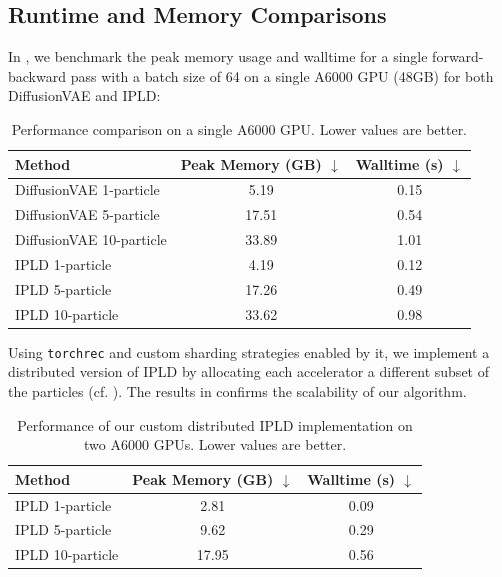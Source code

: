 \subsection{Runtime and Memory Comparisons}
\label{app:runtime-compare}
In , we benchmark the peak memory usage and walltime for a single forward-backward pass with a batch size of 64 on a single A6000 GPU (48GB) for both \gls*{DiffusionVAE} and \gls*{IPLD}:
\begin{table}[h!]
\centering
\caption{Performance comparison on a single A6000 GPU. Lower values are better.}
\label{tab:single_gpu_performance}
\begin{tabular}{
  l
  S[table-format=2.2]
  S[table-format=1.2]
}
\toprule
\textbf{Method} & {\textbf{Peak Memory (GB) $\downarrow$}} & {\textbf{Walltime (s) $\downarrow$}} \\
\midrule
\gls*{DiffusionVAE} 1-particle  & 5.19  & 0.15 \\
\gls*{DiffusionVAE} 5-particle  & 17.51 & 0.54 \\
\gls*{DiffusionVAE} 10-particle & 33.89 & 1.01 \\
\midrule
\gls*{IPLD} 1-particle          & 4.19  & 0.12 \\
\gls*{IPLD} 5-particle          & 17.26 & 0.49 \\
\gls*{IPLD} 10-particle         & 33.62 & 0.98 \\
\bottomrule
\end{tabular}
\end{table}
Using \texttt{torchrec} \citep{torchrec} and custom sharding strategies enabled by it, we implement a distributed version of \gls*{IPLD} by allocating each accelerator a different subset of the particles (cf. ). The results in  confirms the scalability of our algorithm.
\begin{table}[h!]
\centering
\caption{Performance of our custom distributed \gls*{IPLD} implementation on two A6000 GPUs. Lower values are better.}
\label{tab:distributed_gpu_performance}
\begin{tabular}{
  l
  S[table-format=2.2]
  S[table-format=1.2]
}
\toprule
\textbf{Method} & {\textbf{Peak Memory (GB) $\downarrow$}} & {\textbf{Walltime (s) $\downarrow$}} \\
\midrule
\gls*{IPLD} 1-particle  & 2.81  & 0.09 \\
\gls*{IPLD} 5-particle  & 9.62  & 0.29 \\
\gls*{IPLD} 10-particle & 17.95 & 0.56 \\
\bottomrule
\end{tabular}
\end{table}

